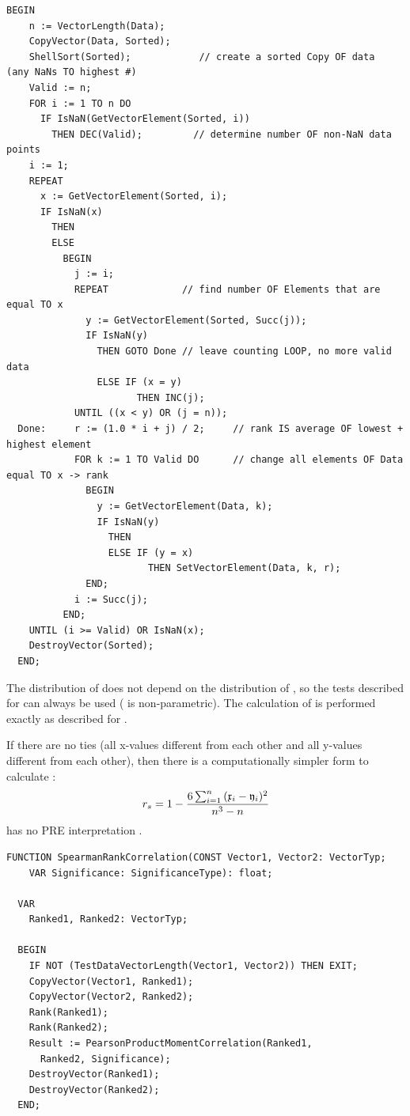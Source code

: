 \begin{refsection}
\begin{lstlisting}[caption=Ranking of a variable]
  BEGIN
    n := VectorLength(Data);
    CopyVector(Data, Sorted);
    ShellSort(Sorted);            // create a sorted Copy OF data  (any NaNs TO highest #)
    Valid := n;
    FOR i := 1 TO n DO
      IF IsNaN(GetVectorElement(Sorted, i))
        THEN DEC(Valid);         // determine number OF non-NaN data points
    i := 1;
    REPEAT
      x := GetVectorElement(Sorted, i);
      IF IsNaN(x)
        THEN
        ELSE
          BEGIN
            j := i;
            REPEAT             // find number OF Elements that are equal TO x
              y := GetVectorElement(Sorted, Succ(j));
              IF IsNaN(y)
                THEN GOTO Done // leave counting LOOP, no more valid data
                ELSE IF (x = y)
                       THEN INC(j);
            UNTIL ((x < y) OR (j = n));
  Done:     r := (1.0 * i + j) / 2;     // rank IS average OF lowest + highest element
            FOR k := 1 TO Valid DO      // change all elements OF Data equal TO x -> rank
              BEGIN
                y := GetVectorElement(Data, k);
                IF IsNaN(y)
                  THEN
                  ELSE IF (y = x)
                         THEN SetVectorElement(Data, k, r);
              END;
            i := Succ(j);
          END;
    UNTIL (i >= Valid) OR IsNaN(x);
    DestroyVector(Sorted);
  END;
\end{lstlisting}

The distribution of  does not depend on the distribution of , so the tests described for  can always be used ( is non-parametric). The calculation of  is performed exactly as described for .

If there are no ties (all x-values different from each other and all y-values different from each other), then there is a computationally simpler form to calculate :
\begin{equation}
  r_s = 1 - \frac{6 \sum_{i=1}^n{(\mathfrak{x}_i - \mathfrak{y}_i)^2}}{n^3-n}
\end{equation}
 has no PRE interpretation \parencite{Fre-86}.

\begin{lstlisting}[caption=\Name{Spearman}'s rank correlation coefficient]
  FUNCTION SpearmanRankCorrelation(CONST Vector1, Vector2: VectorTyp;
    VAR Significance: SignificanceType): float;

  VAR
    Ranked1, Ranked2: VectorTyp;

  BEGIN
    IF NOT (TestDataVectorLength(Vector1, Vector2)) THEN EXIT;
    CopyVector(Vector1, Ranked1);
    CopyVector(Vector2, Ranked2);
    Rank(Ranked1);
    Rank(Ranked2);
    Result := PearsonProductMomentCorrelation(Ranked1,
      Ranked2, Significance);
    DestroyVector(Ranked1);
    DestroyVector(Ranked2);
  END;
\end{lstlisting}


\end{refsection}
